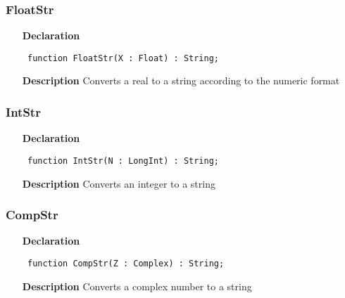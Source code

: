 \documentclass[12pt,a4paper,oneside]{report}
\newcommand{\declarationitem}[1]{\textbf{#1}}
\newcommand{\descriptiontitle}[1]{\textbf{#1}}
\newcommand{\code}[1]{\texttt{#1}}
\begin{document}
\subsubsection{FloatStr}
\label{ustrings-FloatStr}
\begin{itemize}\item[\declarationitem{Declaration}\hfill]
	\begin{flushleft}
		\code{
			function FloatStr(X : Float) : String;}
		
	\end{flushleft}
	
	\par
	\item[\descriptiontitle{Description}]
	Converts a real to a string according to the numeric format
	
\end{itemize}
\subsubsection{IntStr}
\label{ustrings-IntStr}
\begin{itemize}\item[\declarationitem{Declaration}\hfill]
	\begin{flushleft}
		\code{
			function IntStr(N : LongInt) : String;}
		
	\end{flushleft}
	
	\par
	\item[\descriptiontitle{Description}]
	Converts an integer to a string
	
\end{itemize}
\subsubsection{CompStr}
\label{ustrings-CompStr}
\begin{itemize}\item[\declarationitem{Declaration}\hfill]
	\begin{flushleft}
		\code{
			function CompStr(Z : Complex) : String;}
		
	\end{flushleft}
	
	\par
	\item[\descriptiontitle{Description}]
	Converts a complex number to a string
\end{itemize}
\end{document}
